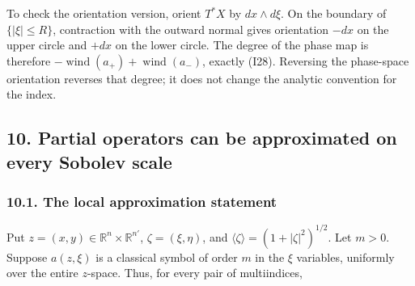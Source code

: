 \documentclass[
  11pt,
]{article}
\makeatletter
\let\ReaderOriginalAnchorStart\hyper@anchorstart
\let\ReaderOriginalAnchorEnd\hyper@anchorend
\let\ReaderPendingAliases\@empty
\def\ReaderArmAliases#1{\gdef\ReaderPendingAliases{#1}}
\def\hyper@anchorstart#1{\ReaderIfNativeAnchorTF{#1}{\ReaderPendingAliases\global\let\ReaderPendingAliases\@empty}{}\ReaderOriginalAnchorStart{#1}}
\makeatother
\begin{document}
To check the orientation version, orient \(T^*X\) by \(dx\wedge d\xi\).
On the boundary of \(\{|\xi|\leq R\}\), contraction with the outward
normal gives orientation \(-dx\) on the upper circle and \(+dx\) on the
lower circle. The degree of the phase map is therefore
\(-\operatorname{wind}(a_+)+\operatorname{wind}(a_-)\), exactly (I28).
Reversing the phase-space orientation reverses that degree; it does not
change the analytic convention for the index.

\ReaderArmAliases{\ReaderOriginalAnchorStart{AN03-GSI-010}\ReaderOriginalAnchorEnd\begingroup\expandafter\def\csname @currentHref\endcsname{AN03-GSI-010}\label{AN03-GSI-010}\endgroup\ReaderOriginalAnchorStart{an03-gsi-010-partial-operators-can-be-approximated-on-every-sobolev-scale}\ReaderOriginalAnchorEnd\begingroup\expandafter\def\csname @currentHref\endcsname{an03-gsi-010-partial-operators-can-be-approximated-on-every-sobolev-scale}\label{an03-gsi-010-partial-operators-can-be-approximated-on-every-sobolev-scale}\endgroup\ReaderOriginalAnchorStart{10-partial-operators-can-be-approximated-on-every-sobolev-scale}\ReaderOriginalAnchorEnd\begingroup\expandafter\def\csname @currentHref\endcsname{10-partial-operators-can-be-approximated-on-every-sobolev-scale}\label{10-partial-operators-can-be-approximated-on-every-sobolev-scale}\endgroup}
\subsection{10. Partial operators can be approximated on every Sobolev
scale}\label{partial-operators-can-be-approximated-on-every-sobolev-scale}

\ReaderArmAliases{\ReaderOriginalAnchorStart{pp-a-the-precise-local-approximation-statement}\ReaderOriginalAnchorEnd\begingroup\expandafter\def\csname @currentHref\endcsname{pp-a-the-precise-local-approximation-statement}\label{pp-a-the-precise-local-approximation-statement}\endgroup\ReaderOriginalAnchorStart{10-1-the-local-approximation-statement}\ReaderOriginalAnchorEnd\begingroup\expandafter\def\csname @currentHref\endcsname{10-1-the-local-approximation-statement}\label{10-1-the-local-approximation-statement}\endgroup}
\subsubsection{10.1. The local approximation
statement}\label{the-local-approximation-statement}

Put \(z=(x,y)\in\mathbb R^n\times\mathbb R^{n'}\), \(\zeta=(\xi,\eta)\),
and \(\langle\zeta\rangle=(1+|\zeta|^2)^{1/2}\). Let \(m>0\). Suppose
\(a(z,\xi)\) is a classical symbol of order \(m\) in the \(\xi\)
variables, uniformly over the entire \(z\)-space. Thus, for every pair
of multiindices,
\end{document}
